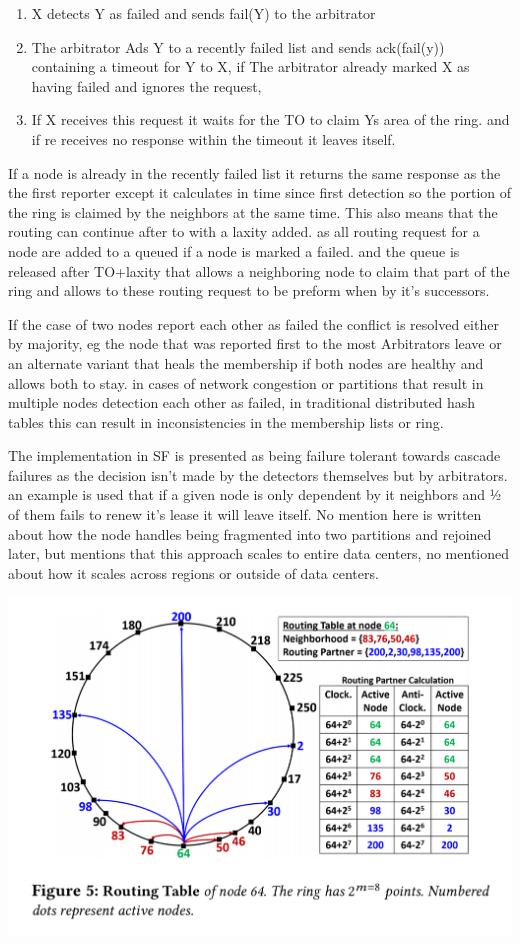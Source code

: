 \documentclass[a4paper,10pt,titlepage]{report}
\begin{document}
\begin{enumerate}
    \item X detects Y as failed and sends fail(Y) to the arbitrator
    \item The arbitrator Ads Y to a recently failed list and sends ack(fail(y)) containing a timeout for Y to X, if The arbitrator already marked X as having failed and ignores the request, 
    \item If X receives this request it waits for the TO to claim Ys area of the ring. and if re receives no response within the timeout it leaves itself.
\end{enumerate}

If a node is already in the recently failed list it returns the same response as the the first reporter except it calculates in time since first detection so the portion of the ring is claimed by the neighbors at the same time. This also means that the routing can continue after to with a laxity added. as all routing request for a node are added to a queued if a node is marked a failed. and the queue is released after TO+laxity that allows a neighboring node to claim that part of the ring and allows to these routing request to be preform when by it's successors.

If the case of two nodes report each other as failed the conflict is resolved either by majority, eg the node that was reported first to the most Arbitrators leave or an alternate variant that heals the membership if both nodes are healthy and allows both to stay. in cases of network congestion or partitions that result in multiple nodes detection each other as failed, in traditional distributed hash tables this can result in inconsistencies in the membership lists or ring. 

The implementation in SF is presented as being failure tolerant towards cascade failures as the decision isn't made by the detectors themselves but by arbitrators. an example is used that if a given node is only dependent by it neighbors and ½ of them fails to renew it's lease it will leave itself. No mention here is written about how the node handles being fragmented into two partitions and rejoined later, but mentions that this approach scales to entire data centers, no mentioned about how it scales across regions or outside of data centers.

\includegraphics[scale=0.3]{Report/images/servicefabric-fig-ring-topology.jpeg}
\end{document}
